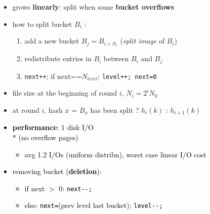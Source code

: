 \documentclass[10pt, landscape]{article}
\begin{document}
\begin{multicols*}{4}
  \begin{itemize}
    \item grows \textbf{linearly}: split when some \textbf{bucket overflows}
    \item how to split bucket $B_i$ : 
      \begin{enumerate}
        \item add a new bucket $B_j = B_{i+N_i}$ (\textit{split image} of $B_i$)
        \item redistribute entries in $B_i$ between $B_i$ and $B_j$
        \item \texttt{next++}; if next==$N_{level}$: \texttt{level++; next=0}
      \end{enumerate}
    \item file size at the beginning of round $i$, $N_i = 2^iN_0$
    \item at round $i$, hash $x$ = $B_x$ has been split ? $h_i(k)$ : $h_{i+1}(k)$
  \end{itemize}
  \begin{minipage}[c]{0.6\linewidth}{\textcolor{black}{
        \begin{itemize}
          \item \textbf{performance}: 1 disk I/O \\* (no overflow pages)
            \begin{itemize}
              \item avg 1.2 I/Os (uniform distribn), worst case linear I/O cost
            \end{itemize}
          \item removing bucket (\textbf{deletion}): 
            \begin{itemize}
              \item if next $>$ 0: \texttt{next-{}-;}
              \item else: \texttt{next=}(prev level last bucket); \texttt{level-{}-;}
            \end{itemize}
        \end{itemize}
    }}
  \end{minipage}
  \begin{minipage}[c]{0.37\linewidth}

\end{minipage}
\end{multicols*}
\end{document}
